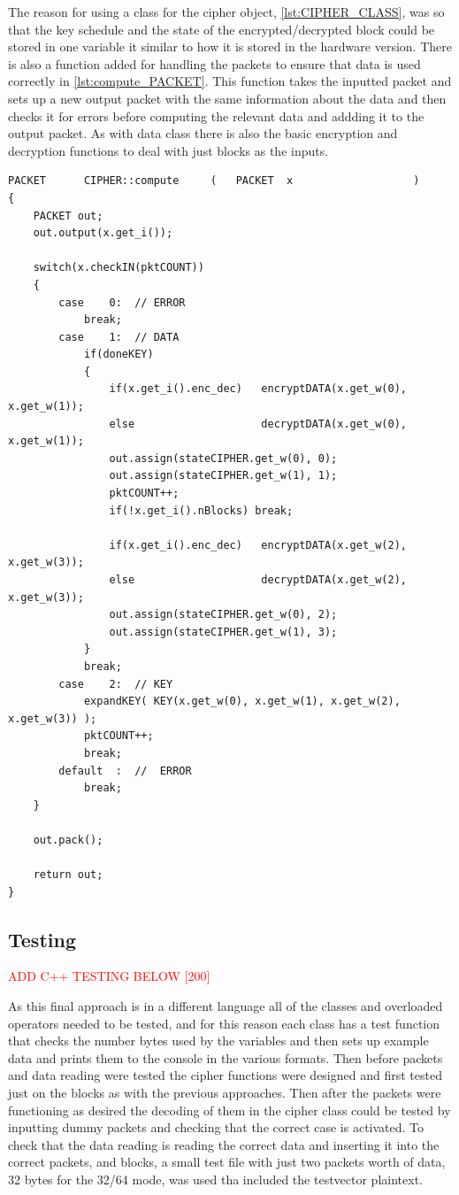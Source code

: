 \documentclass[12pt,twoside,a4paper]{report}
\begin{document}
   	The reason for using a class for the cipher object, \autoref{lst:CIPHER_CLASS}, was so that the key schedule and the state of the encrypted/decrypted block could be stored in one variable it similar to how it is stored in the hardware version. There is also a function added for handling the packets to ensure that data is used correctly in \autoref{lst:compute_PACKET}. This function takes the inputted packet and sets up a new output packet with the same information about the data and then checks it for errors before computing the relevant data and addding it to the output packet. As with data class there is also the basic encryption and decryption functions to deal with just blocks as the inputs.

 	\begin{minipage}{\linewidth}
	\begin{lstlisting}[label={lst:compute_PACKET},caption={The function for handling the packets},style=CStyle]	
PACKET		CIPHER::compute		(	PACKET	x					)
{
	PACKET out;
	out.output(x.get_i());
	
	switch(x.checkIN(pktCOUNT))
	{
		case	0:	// ERROR
			break;
		case	1:	// DATA
			if(doneKEY)
			{
				if(x.get_i().enc_dec)	encryptDATA(x.get_w(0), x.get_w(1));
				else					decryptDATA(x.get_w(0), x.get_w(1));
				out.assign(stateCIPHER.get_w(0), 0);
				out.assign(stateCIPHER.get_w(1), 1);
				pktCOUNT++;
				if(!x.get_i().nBlocks) break;
				
				if(x.get_i().enc_dec)	encryptDATA(x.get_w(2), x.get_w(3));
				else					decryptDATA(x.get_w(2), x.get_w(3));
				out.assign(stateCIPHER.get_w(0), 2);
				out.assign(stateCIPHER.get_w(1), 3);
			}
			break;
		case	2:	// KEY
			expandKEY( KEY(x.get_w(0), x.get_w(1), x.get_w(2), x.get_w(3)) );
			pktCOUNT++;
			break;
		default	 :	//	ERROR
			break;
	}
	
	out.pack();
	
	return out;
}
	\end{lstlisting}
	\end{minipage}
    
    \subsection{Testing}
	\textcolor{red}{ADD C++ TESTING BELOW [200]} 
	
	As this final approach is in a different language all of the classes and overloaded operators needed to be tested, and for this reason each class has a test function that checks the number bytes used by the variables and then sets up example data and prints them to the console in the various formats. Then before packets and data reading were tested the cipher functions were designed and first tested just on the blocks as with the previous approaches. Then after the packets were functioning as desired the decoding of them in the cipher class could be tested by inputting dummy packets and checking that the correct case is activated. To check that the data reading is reading the correct data and inserting it into the correct packets, and blocks, a small test file with just two packets worth of data, 32 bytes for the 32/64 mode, was used tha included the testvector plaintext.
	
\end{document}

